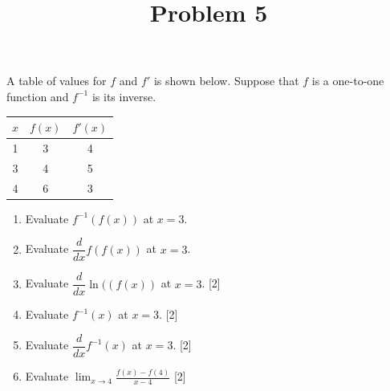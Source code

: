 \documentclass{ximera}
\title[Problem 5]{Problem 5}
\begin{document}
\begin{abstract} \end{abstract}
\maketitle

\begin{problem}
  A table of values for $f$ and $f'$ is shown below.
  Suppose that $f$ is a one-to-one function and $f^{-1}$ is its inverse.
  \begin{center}
    \begin{tabular}{ccc}
\hline
      $x$ & $f(x)$ & $f'(x)$\\
\hline \hline
      1 & 3 & 4\\

      3 & 4 & 5\\

      4 & 6 & 3\\
\hline
    \end{tabular}
  \end{center}

  \begin{enumerate}
    \item Evaluate $f^{-1}(f(x))$ at $x = 3$.
\item Evaluate $\dfrac{d}{dx} f(f(x))$ at $x = 3$.
\item Evaluate $\dfrac{d}{dx}\ln((f(x))$ at $x = 3$.
[2]
      
    \item Evaluate $f^{-1}(x)$ at $x = 3$.
[2]
      
    \item Evaluate $\dfrac{d}{dx} f^{-1}(x)$ at $x = 3$.
[2]
      
      \item Evaluate $\lim_{x \to 4} \frac{f(x)-f(4)}{x-4}$
[2]
      
  \end{enumerate}
\end{problem}
\end{document}
